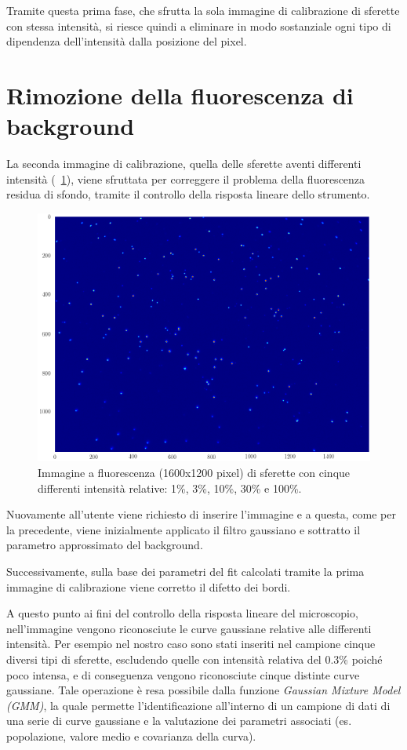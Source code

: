 Tramite questa prima fase, che sfrutta la sola immagine di calibrazione di sferette con stessa intensità, si riesce quindi a eliminare in modo sostanziale ogni tipo di dipendenza dell'intensità dalla posizione del pixel. 

\section{Rimozione della fluorescenza di background}

La seconda immagine di calibrazione, quella delle sferette aventi differenti intensità (\figurename~\ref{fig:piuint}), viene sfruttata per correggere il problema della fluorescenza residua di sfondo, tramite il controllo della risposta lineare dello strumento. 

\begin{figure}
 \centering
 \includegraphics[scale=.60]{img/CAP3piuint.png}
 \caption{\small{Immagine a fluorescenza (1600x1200 pixel) di sferette con cinque differenti intensità relative: 1\%, 3\%, 10\%, 30\% e 100\%.}}
 \label{fig:piuint}
\end{figure}

Nuovamente all'utente viene richiesto di inserire l'immagine e a questa, come per la precedente, viene inizialmente applicato il filtro gaussiano e sottratto il parametro approssimato del background. 

Successivamente, sulla base dei parametri del fit calcolati tramite la prima immagine di calibrazione viene corretto il difetto dei bordi.

A questo punto ai fini del controllo della risposta lineare del microscopio,  nell'immagine vengono riconosciute le curve gaussiane relative alle differenti intensità. 
Per esempio nel nostro caso sono stati inseriti nel campione cinque diversi tipi di sferette, escludendo quelle con intensità relativa del 0.3\% poiché poco intensa, e di conseguenza vengono riconosciute cinque distinte curve gaussiane.
Tale operazione è resa possibile dalla funzione \textit{Gaussian Mixture Model (GMM)}, la quale permette l'identificazione all'interno di un campione di dati di una serie di curve gaussiane e la valutazione dei parametri associati (es. popolazione, valore medio e covarianza della curva).

